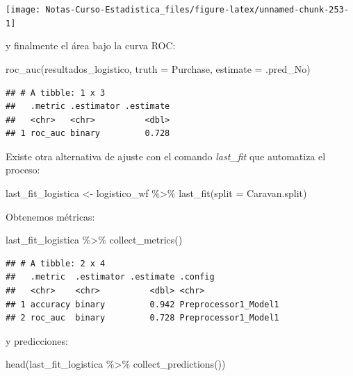 \documentclass[
  12pt,
]{book}
\newenvironment{Shaded}{\begin{snugshade}}{\end{snugshade}}
\newcommand{\AttributeTok}[1]{\textcolor[rgb]{0.77,0.63,0.00}{#1}}
\newcommand{\FunctionTok}[1]{\textcolor[rgb]{0.00,0.00,0.00}{#1}}
\newcommand{\NormalTok}[1]{#1}
\newcommand{\OtherTok}[1]{\textcolor[rgb]{0.56,0.35,0.01}{#1}}
\newcommand{\SpecialCharTok}[1]{\textcolor[rgb]{0.00,0.00,0.00}{#1}}
\theoremstyle{definition}
\theoremstyle{definition}
\theoremstyle{definition}
\theoremstyle{definition}
\theoremstyle{remark}
\begin{document}
\begin{center}\texttt{[image: Notas-Curso-Estadistica\_files/figure-latex/unnamed-chunk-253-1]} \end{center}

y finalmente el área bajo la curva ROC:

\begin{Shaded}
\begin{Highlighting}[]
\FunctionTok{roc\_auc}\NormalTok{(resultados\_logistico, }\AttributeTok{truth =}\NormalTok{ Purchase, }\AttributeTok{estimate =}\NormalTok{ .pred\_No)}
\end{Highlighting}
\end{Shaded}

\begin{verbatim}
## # A tibble: 1 x 3
##   .metric .estimator .estimate
##   <chr>   <chr>          <dbl>
## 1 roc_auc binary         0.728
\end{verbatim}

Existe otra alternativa de ajuste con el comando \emph{last\_fit} que automatiza el proceso:

\begin{Shaded}
\begin{Highlighting}[]
\NormalTok{last\_fit\_logistica }\OtherTok{\textless{}{-}}\NormalTok{ logistico\_wf }\SpecialCharTok{\%\textgreater{}\%}
    \FunctionTok{last\_fit}\NormalTok{(}\AttributeTok{split =}\NormalTok{ Caravan.split)}
\end{Highlighting}
\end{Shaded}

Obtenemos métricas:

\begin{Shaded}
\begin{Highlighting}[]
\NormalTok{last\_fit\_logistica }\SpecialCharTok{\%\textgreater{}\%}
    \FunctionTok{collect\_metrics}\NormalTok{()}
\end{Highlighting}
\end{Shaded}

\begin{verbatim}
## # A tibble: 2 x 4
##   .metric  .estimator .estimate .config             
##   <chr>    <chr>          <dbl> <chr>               
## 1 accuracy binary         0.942 Preprocessor1_Model1
## 2 roc_auc  binary         0.728 Preprocessor1_Model1
\end{verbatim}

y predicciones:

\begin{Shaded}
\begin{Highlighting}[]
\FunctionTok{head}\NormalTok{(last\_fit\_logistica }\SpecialCharTok{\%\textgreater{}\%}
    \FunctionTok{collect\_predictions}\NormalTok{())}
\end{Highlighting}
\end{Shaded}
\end{document}

